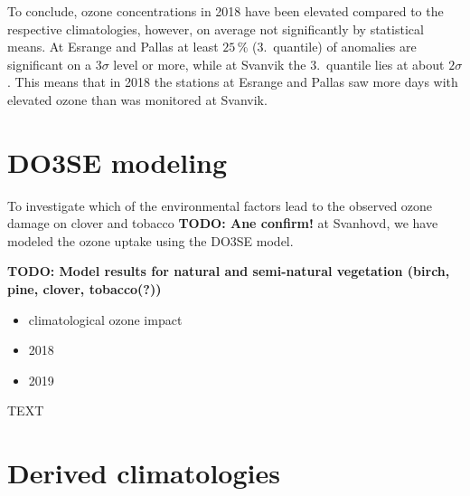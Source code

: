 \documentclass[bg, manuscript]{copernicus}
\begin{document}
To conclude, ozone concentrations in 2018 have been elevated compared to the respective climatologies, however, on average not significantly by statistical means. At Esrange and Pallas at least $25\,\unit{\%}$ (3.~quantile) of anomalies are significant on a $3\sigma$ level or more, while at Svanvik the 3.~quantile lies at about $2\sigma$. This means that in 2018 the stations at Esrange and Pallas saw more days with elevated ozone than was monitored at Svanvik. 

\section{DO3SE modeling}
\label{sec:do3se}
To investigate which of the environmental factors lead to the observed ozone damage on clover and tobacco {\bf TODO: Ane confirm!} at Svanhovd, we have modeled the ozone uptake using the DO3SE model.

{\bf TODO: Model results for natural and semi-natural vegetation (birch, pine, clover, tobacco(?))}
\begin{itemize}
\item climatological ozone impact
\item 2018
\item 2019
\end{itemize}


\conclusions  %
\label{sec:conc}
TEXT












\appendix
\section{Derived climatologies}    %
\end{document}
